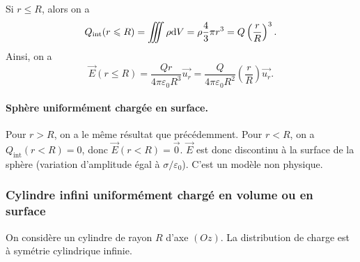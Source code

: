                 Si $r\leqslant R$, alors on a 
                \begin{equation*}
                    Q_{\text{int}}(r\leqslant R)=\iiint \rho\mathrm{d} V=\rho\frac{4}{3}\pi r^{3}=Q\left(\frac{r}{R}\right)^{3}.
                \end{equation*}
                Ainsi, on a 
                \begin{equation*}
                    \boxed{
                        \vec{E}(r\leqslant R)=\frac{Qr}{4\pi\varepsilon_0 R^{3}}\vec{u_r}=\frac{Q}{4\pi\varepsilon_0 R^{2}}\left(\frac{r}{R}\right)\vec{u_r}.
                    }
                \end{equation*}

            \paragraph{Sphère uniformément chargée en surface.}

                Pour $r>R$, on a le même résultat que précédemment. Pour $r<R$, on a $Q_{\text{int}}(r<R)=0$, donc $\vec{E}(r<R)=\vec{0}$. $\vec{E}$ est donc discontinu à la surface de la sphère (variation d'amplitude égal à $\sigma/\varepsilon_{0}$). C'est un modèle non physique.                

        \subsubsection{Cylindre infini uniformément chargé en volume ou en surface}

            On considère un cylindre de rayon $R$ d'axe $(Oz)$.
            La distribution de charge est à symétrie cylindrique \og infinie\fg. 

